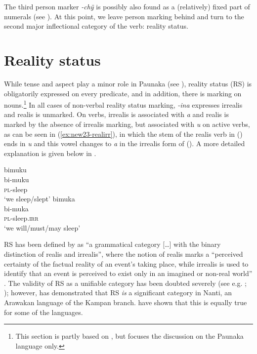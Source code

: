 The third person marker \textit{-chÿ} is possibly also found as a (relatively) fixed part of numerals (see ). At this point, we leave person marking behind and turn to the second major inflectional category of the verb: reality status.

\section{Reality status}\label{sec:RealityStatus}

While tense and aspect play a minor role in Paunaka (see ), reality status (RS) is obligatorily expressed on every predicate, and in addition, there is  marking on nouns.\footnote{This section is partly based on \citet[]{DanielsenTerhartSubm}, but focuses the discussion on the Paunaka language only.} In all cases of non-verbal reality status marking, \textit{-ina} expresses irrealis and realis is unmarked. On verbs, irrealis is associated with \textit{a} and realis is marked by the absence of irrealis marking, but associated with \textit{u} on active verbs, as can be seen in (\ref{ex:new23-realirr}), in which the stem of the realis verb in () ends in \textit{u} and this vowel changes to \textit{a} in the irrealis form of (). A more detailed explanation is given below in .

\ea\label{ex:new23-realirr}
  \ea\label{ex:new23-realirr.1}
\begingl
\glpreamble bimuku\\
\gla bi-muku\\
\textsc{pl}-sleep\\
\glft ‘we sleep/slept’
\endgl
  \ex\label{ex:new23-realirr.2}
\begingl
\glpreamble bimuka\\
\gla bi-muka\\
\textsc{pl}-sleep.\textsc{irr}\\
\glft ‘we will/must/may sleep’
\endgl
\z
\xe

RS has been defined by \citet[56]{Elliott2000} as “a grammatical category […] with the binary distinction of realis and irrealis”, where the notion of realis marks a “perceived certainty of the factual reality of an event's taking place, while irrealis is used to identify that an event is perceived to exist only in an imagined or non-real world” \citep[67]{Elliott2000}. 
The validity of RS as a unifiable category has been doubted severely (see e.g. \citealt{Bybee1998}; \citealt{deHaan2012}); however, \citet[]{Michael2014,Michael2014a} has demonstrated that RS \textit{is} a significant category in Nanti, an Arawakan language of the Kampan branch. \citet[]{DanielsenTerhartSubm} have shown that this is equally true for some of the  languages.

